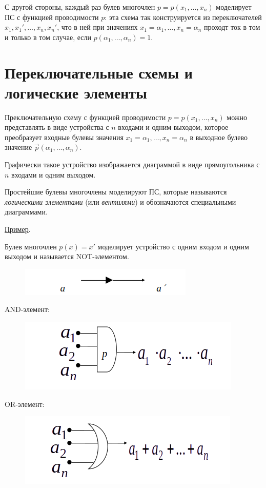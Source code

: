 С другой стороны, каждый раз булев многочлен $p=p(x_1,\dots,x_n)$ моделирует ПС с функцией проводимости $p$: эта схема так конструируется из переключателей $x_1, x_1', \dots, x_n, x_n'$, что в ней при значениях $x_1 = \alpha_1, \dots, x_n = \alpha_n$ проходт ток в том и только в том случае, если $p(\alpha_1, \dots, \alpha_n) = 1$.

\section{Переключательные схемы и логические элементы}
Преключательную схему с функцией проводимости $p=p(x_1,\dots,x_n)$ можно представлять в виде устройства с $n$ входами и одним выходом, которое преобразует входные булевы значения $x_1 = \alpha_1, \dots, x_n = \alpha_n$ в выходное булево значение $\vec p(\alpha_1, \dots, \alpha_n)$.

Графически такое устройство изображается диаграммой в виде прямоугольника с $n$ входами и одним выходом.

Простейшие булевы многочлены моделируют ПС, которые называются \textit{логическими элементами} (или \textit{вентилями}) и обозначаются специальными диаграммами.

\underline{Пример}.

Булев многочлен $p(x)=x'$ моделирует устройство с одним входом и одним выходом и называется NOT-элементом.

\begin{figure}[H]
    \centering
    \includegraphics[scale=0.5]{графика/not.png}
\end{figure}

AND-элемент:

\begin{figure}[H]
    \centering
    \includegraphics[scale=0.5]{графика/and.png}
\end{figure}

OR-элемент:

\begin{figure}[H]
    \centering
    \includegraphics[scale=0.5]{графика/or.png}
\end{figure}

